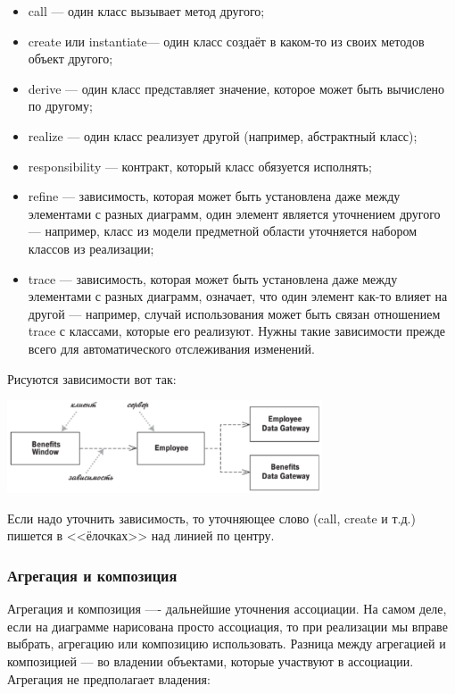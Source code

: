 \documentclass{../text-style}
\begin{document}
\begin{itemize}
    \item call --- один класс вызывает метод другого;
    \item create или instantiate--- один класс создаёт в каком-то из своих методов объект другого;
    \item derive --- один класс представляет значение, которое может быть вычислено по другому;
    \item realize --- один класс реализует другой (например, абстрактный класс);
    \item responsibility --- контракт, который класс обязуется исполнять;
    \item refine --- зависимость, которая может быть установлена даже между элементами с разных диаграмм, один элемент является уточнением другого --- например, класс из модели предметной области уточняется набором классов из реализации;
    \item trace --- зависимость, которая может быть установлена даже между элементами с разных диаграмм, означает, что один элемент как-то влияет на другой --- например, случай использования может быть связан отношением trace с классами, которые его реализуют. Нужны такие зависимости прежде всего для автоматического отслеживания изменений.
\end{itemize}

Рисуются зависимости вот так:

\begin{center}
    \includegraphics[width=0.7\textwidth]{dependencies.png}
\end{center}

Если надо уточнить зависимость, то уточняющее слово (call, create и т.д.) пишется в <<ёлочках>> над линией по центру.

\subsubsection{Агрегация и композиция}

Агрегация и композиция ---- дальнейшие уточнения ассоциации. На самом деле, если на диаграмме нарисована просто ассоциация, то при реализации мы вправе выбрать, агрегацию или композицию использовать. Разница между агрегацией и композицией --- во владении объектами, которые участвуют в ассоциации. Агрегация не предполагает владения:
\end{document}
